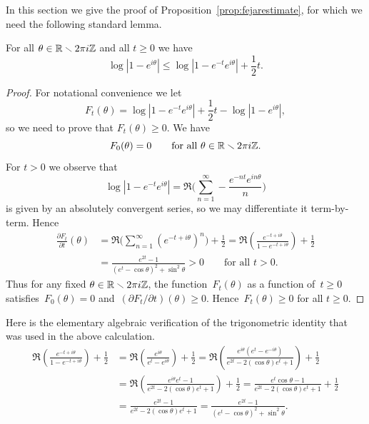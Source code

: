 \documentclass[12pt,reqno]{amsart}
\begin{document}
In this section we give the proof of
Proposition~\ref{prop:fejarestimate}, for which we need the
following standard lemma.

\begin{lemma}
\label{lemma:Gttheta}
For all $\theta\in\mathbb{R}\smallsetminus2\pi i\mathbb{Z}$ and all $t\ge0$
we have
\[
  \log|1-e^{i\theta}| \le \log|1-e^{-t}e^{i\theta}| + \frac12t.
\]
\end{lemma}
\begin{proof}
For notational convenience we let
\[
  F_t(\theta) =
  \log|1-e^{-t}e^{i\theta}| + \frac12t - \log|1-e^{i\theta}|,
\]
so we need to prove that $F_t(\theta)\ge0$.  We have
\[
  F_0(\theta)=0
  \qquad\text{for all $\theta\in\mathbb{R}\smallsetminus2\pi i\mathbb{Z}$.}
\]
For $t>0$ we observe that
\[
  \log|1-e^{-t}e^{i\theta}|
   = \Re\biggl(\sum_{n=1}^\infty -\frac{e^{-nt}e^{in\theta}}{n}\biggr)
\]
is given by an absolutely convergent series, so we may differentiate it
term-by-term. Hence
\begin{align*}
  \frac{\partial F_t}{\partial t}(\theta)
  &= \Re\biggl(\sum_{n=1}^\infty (e^{-t+i\theta})^n\biggr) + \frac12 
  = \Re\left( \frac{e^{-t+i\theta}}{1-e^{-t+i\theta}}\right) + \frac12 \\
  &= \frac{e^{2t}-1}{(e^t-\cos\theta)^2+\sin^2\theta} 
   > 0 \qquad\text{for all $t>0$.}
\end{align*}
Thus for any fixed $\theta\in\mathbb{R}\smallsetminus2\pi i\mathbb{Z}$, the
function~$F_t(\theta)$ as a function of~$t\ge0$
satisfies~$F_0(\theta)=0$ and~$(\partial F_t/\partial t)(\theta)\ge
0$. Hence~$F_t(\theta)\ge0$ for all $t\ge0$. 
\end{proof}

{\tiny
Here is the elementary algebraic verification of the trigonometric
identity that was used in the above calculation.
\begin{align*}
  \Re\left( \frac{e^{-t+i\theta}}{1-e^{-t+i\theta}}\right) + \frac12 
  &= \Re\left(\frac{e^{i\theta}}{e^t-e^{i\theta}}\right) + \frac12  
  = \Re\left(\frac{e^{i\theta}(e^t-e^{-i\theta})}{e^{2t}-2(\cos\theta)e^t+1}\right)
          + \frac12 \\
  &= \Re\left(\frac{e^{i\theta}e^t-1}{e^{2t}-2(\cos\theta)e^t+1}\right)
          + \frac12 
  = \frac{e^t\cos\theta-1}{e^{2t}-2(\cos\theta)e^t+1}+\frac12 \\
  &= \frac{e^{2t}-1}{e^{2t}-2(\cos\theta)e^t+1} 
  = \frac{e^{2t}-1}{(e^t-\cos\theta)^2+\sin^2\theta}.
\end{align*}
}
\end{document}
